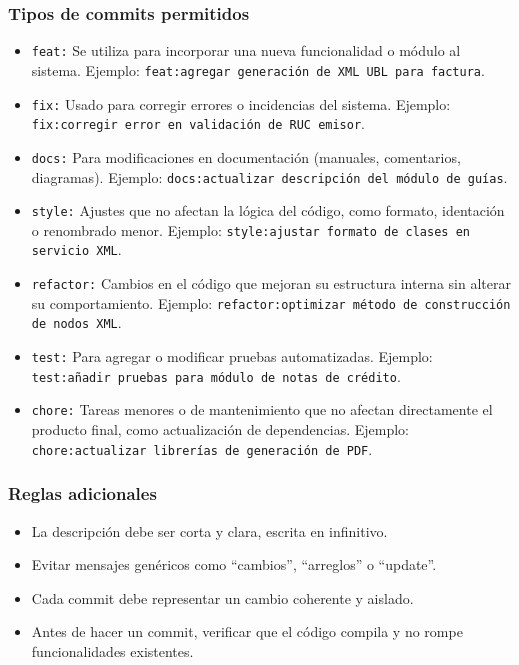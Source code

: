 \documentclass[12pt, a4paper]{article}
\begin{document}
\subsubsection{Tipos de commits permitidos}
\begin{itemize}
  \item \texttt{feat:} Se utiliza para incorporar una nueva funcionalidad o módulo al sistema. Ejemplo: \texttt{feat:\allowbreak agregar generaci\'on de XML UBL para factura}.
  \item \texttt{fix:} Usado para corregir errores o incidencias del sistema. Ejemplo: \texttt{fix:\allowbreak corregir error en validaci\'on de RUC emisor}.
  \item \texttt{docs:} Para modificaciones en documentación (manuales, comentarios, diagramas). Ejemplo: \texttt{docs:\allowbreak actualizar descripci\'on del m\'odulo de gu\'ias}.
  \item \texttt{style:} Ajustes que no afectan la lógica del código, como formato, identación o renombrado menor. Ejemplo: \texttt{style:\allowbreak ajustar formato de clases en servicio XML}.
  \item \texttt{refactor:} Cambios en el código que mejoran su estructura interna sin alterar su comportamiento. Ejemplo: \texttt{refactor:\allowbreak optimizar m\'etodo de construcci\'on de nodos XML}.
  \item \texttt{test:} Para agregar o modificar pruebas automatizadas. Ejemplo: \texttt{test:\allowbreak a\~nadir pruebas para m\'odulo de notas de cr\'edito}.
  \item \texttt{chore:} Tareas menores o de mantenimiento que no afectan directamente el producto final, como actualización de dependencias. Ejemplo: \texttt{chore:\allowbreak actualizar librer\'ias de generaci\'on de PDF}.
\end{itemize}

\subsubsection{Reglas adicionales}
\begin{itemize}
  \item La descripción debe ser corta y clara, escrita en infinitivo.
  \item Evitar mensajes genéricos como ``cambios'', ``arreglos'' o ``update''.
  \item Cada commit debe representar un cambio coherente y aislado.
  \item Antes de hacer un commit, verificar que el código compila y no rompe funcionalidades existentes.
\end{itemize}
\end{document}
